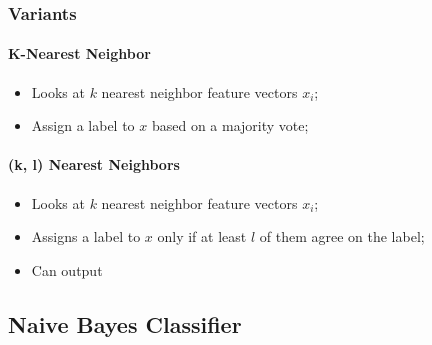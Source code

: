     \subsubsection{Variants}
    
      \paragraph{K-Nearest Neighbor}
      \begin{itemize}
        \item Looks at $ k $ nearest neighbor feature vectors $ x_{i} $;
        \item Assign a label to $ x $ based on a majority vote;
      \end{itemize}
      
      \paragraph{(k, l) Nearest Neighbors}
      \begin{itemize}
        \item Looks at $ k $ nearest neighbor feature vectors $ x_{i} $;
        \item Assigns a label to $ x $ only if at least $ l $ of them agree on the label;
        \item Can output 
      \end{itemize}
      
  \subsection{Naive Bayes Classifier}
  
